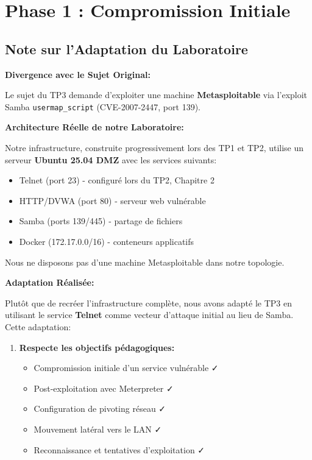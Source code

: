 \documentclass[12pt,a4paper,openany]{report}
\begin{document}
\chapter{Phase 1 : Compromission Initiale}

\section{Note sur l'Adaptation du Laboratoire}
\begin{tcolorbox}[colback=secondary!5!white, colframe=secondary, 
	title=\textbf{ADAPTATION TECHNIQUE DU TP3},
	breakable]
	
	\textbf{Divergence avec le Sujet Original:}
	
	Le sujet du TP3 demande d'exploiter une machine \textbf{Metasploitable} 
	via l'exploit Samba \texttt{usermap\_script} (CVE-2007-2447, port 139).
	
	\textbf{Architecture Réelle de notre Laboratoire:}
	
	Notre infrastructure, construite progressivement lors des TP1 et TP2, 
	utilise un serveur \textbf{Ubuntu 25.04 DMZ} avec les services suivants:
	\begin{itemize}
		\item Telnet (port 23) - configuré lors du TP2, Chapitre 2
		\item HTTP/DVWA (port 80) - serveur web vulnérable
		\item Samba (ports 139/445) - partage de fichiers
		\item Docker (172.17.0.0/16) - conteneurs applicatifs
	\end{itemize}
	
	Nous ne disposons pas d'une machine Metasploitable dans notre topologie.
	
	\textbf{Adaptation Réalisée:}
	
	Plutôt que de recréer l'infrastructure complète, nous avons adapté le 
	TP3 en utilisant le service \textbf{Telnet} comme vecteur d'attaque 
	initial au lieu de Samba. Cette adaptation:
	
	\begin{enumerate}
		\item \textbf{Respecte les objectifs pédagogiques:}
		\begin{itemize}
			\item Compromission initiale d'un service vulnérable ✓
			\item Post-exploitation avec Meterpreter ✓
			\item Configuration de pivoting réseau ✓
			\item Mouvement latéral vers le LAN ✓
			\item Reconnaissance et tentatives d'exploitation ✓
		\end{itemize}
		

\end{enumerate}
\end{tcolorbox}
\end{document}
